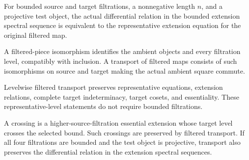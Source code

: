 \begin{theorem}
\label{sem:SpectralSequence:ess-equation}
For bounded source and target filtrations, a nonnegative length $n$, and a projective test object, the actual differential relation in the bounded extension spectral sequence is equivalent to the representative extension equation for the original filtered map.
\end{theorem}

\begin{definition}
\label{sem:SpectralSequence:filtered-transport}
A filtered-piece isomorphism identifies the ambient objects and every filtration level, compatibly with inclusion. A transport of filtered maps consists of such isomorphisms on source and target making the actual ambient square commute.
\end{definition}

\begin{theorem}
\label{sem:SpectralSequence:extension-transport}
Levelwise filtered transport preserves representative equations, extension relations, complete target indeterminacy, target cosets, and essentiality. These representative-level statements do not require bounded filtrations.
\end{theorem}

\begin{theorem}
\label{sem:SpectralSequence:crossing-transport}
A crossing is a higher-source-filtration essential extension whose target level crosses the selected bound. Such crossings are preserved by filtered transport. If all four filtrations are bounded and the test object is projective, transport also preserves the differential relation in the extension spectral sequences.
\end{theorem}

